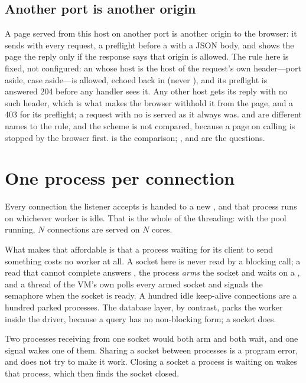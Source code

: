 \subsection{Another port is another origin}
\label{sec:origins}

A page served from this host on another port is another origin to the
browser: it sends  with every request, a preflight 
before a  with a JSON body, and shows the page the reply only if
the response says that origin is allowed. The rule here is fixed, not
configured: an  whose host is the host of the request's own
 header---port aside, case aside---is allowed, echoed back in
 (never \ct{*}), and its preflight is
answered 204 before any handler sees it. Any other host gets its reply with
no such header, which is what makes the browser withhold it from the page,
and a 403 for its preflight; a request with no  is served as it
always was.  and  are different names to the
rule, and the scheme is not compared, because a page on  calling
 is stopped by the browser first.  is the
comparison; ,  and  are
the questions.

\section{One process per connection}

Every connection the listener accepts is handed to a new , and
that process runs on whichever worker is idle. That is the whole of the
threading: with the pool running, \(N\) connections are served on \(N\) cores.

What makes that affordable is that a process waiting for its client to send
something costs no worker at all. A socket here is never read by a blocking
call; a read that cannot complete answers , the process \emph{arms}
the socket and waits on a , and a thread of the VM's own polls
every armed socket and signals the semaphore when the socket is ready. A
hundred idle keep-alive connections are a hundred parked processes. The
database layer, by contrast, parks the worker inside the driver, because a
query has no non-blocking form; a socket does.

\begin{stwarn}
Two processes receiving from one socket would both arm and both wait, and one
signal wakes one of them. Sharing a socket between processes is a program
error, and  does not try to make it work. Closing a socket a
process is waiting on wakes that process, which then finds the socket closed.
\end{stwarn}

